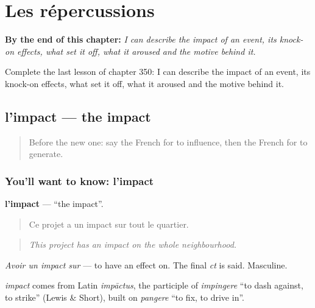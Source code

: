 
\chapter{Les répercussions}
\label{ch:fr-les-repercussions}

\begin{chapteropening}
\textbf{By the end of this chapter:} \emph{I can describe the impact of an event, its knock-on effects, what set it off, what it aroused and the motive behind it.}

Complete the last lesson of chapter 350: I can describe the impact of an event, its knock-on effects, what set it off, what it aroused and the motive behind it.
\end{chapteropening}

\section[l'impact]{l'impact — the impact}

\label{lesson:FR-C350-impact}



\begin{quote}
Before the new one: say the French for to influence, then the French for to generate.
\end{quote}

\subsection*{You'll want to know: l'impact}
\textbf{l'impact} — \textquotedblleft{}the impact\textquotedblright{}.

\begin{quote}
Ce projet a un impact sur tout le quartier.
\end{quote}

\begin{quote}
\emph{This project has an impact on the whole neighbourhood.}
\end{quote}

\emph{Avoir un impact sur} — to have an effect on. The final \emph{ct} is said. Masculine.

\begin{cousinweb}
\emph{impact} comes from Latin \emph{impāctus}, the participle of \emph{impingere} \textquotedblleft{}to dash against, to strike\textquotedblright{} (Lewis \& Short), built on \emph{pangere} \textquotedblleft{}to fix, to drive in\textquotedblright{}.
\end{cousinweb}

